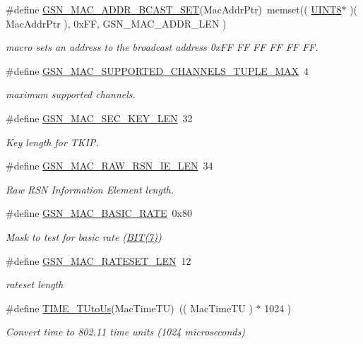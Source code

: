 \begin{DoxyCompactItemize}
\#define \hyperlink{a00642_ga3b8dd261cd46e061d18d2630039df685}{GSN\_\-MAC\_\-ADDR\_\-BCAST\_\-SET}(MacAddrPtr)~memset(( \hyperlink{a00660_gab27e9918b538ce9d8ca692479b375b6a}{UINT8}$\ast$ )( MacAddrPtr ), 0xFF, GSN\_\-MAC\_\-ADDR\_\-LEN )
\begin{DoxyCompactList}\small\item\em macro sets an address to the broadcast address 0xFF FF FF FF FF FF. \end{DoxyCompactList}\item 
\#define \hyperlink{a00642_gac3c796c333ec1130603aadab0258164a}{GSN\_\-MAC\_\-SUPPORTED\_\-CHANNELS\_\-TUPLE\_\-MAX}~4
\begin{DoxyCompactList}\small\item\em maximum supported channels. \end{DoxyCompactList}\item 
\#define \hyperlink{a00642_gabedb9ac65e149bcb1082d6926937508f}{GSN\_\-MAC\_\-SEC\_\-KEY\_\-LEN}~32
\begin{DoxyCompactList}\small\item\em Key length for TKIP. \end{DoxyCompactList}\item 
\#define \hyperlink{a00642_gade0df88c41a2fec188655329c10a73ed}{GSN\_\-MAC\_\-RAW\_\-RSN\_\-IE\_\-LEN}~34
\begin{DoxyCompactList}\small\item\em Raw RSN Information Element length. \end{DoxyCompactList}\item 
\#define \hyperlink{a00642_ga5dd3f6052d990b4ee0d404f05787ce20}{GSN\_\-MAC\_\-BASIC\_\-RATE}~0x80
\begin{DoxyCompactList}\small\item\em Mask to test for basic rate (\hyperlink{a00481_a3a8ea58898cb58fc96013383d39f482c}{BIT(7)}) \end{DoxyCompactList}\item 
\#define \hyperlink{a00642_ga3c207cac645e3d78288b23f6291d759e}{GSN\_\-MAC\_\-RATESET\_\-LEN}~12
\begin{DoxyCompactList}\small\item\em rateset length \end{DoxyCompactList}\item 
\#define \hyperlink{a00642_gabec601feeb30bf739dc67873ac12c4ba}{TIME\_\-TUtoUs}(MacTimeTU)~(( MacTimeTU ) $\ast$ 1024 )
\begin{DoxyCompactList}\small\item\em Convert time to 802.11 time units (1024 microseconds) \end{DoxyCompactList}\end{DoxyCompactItemize}
